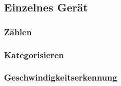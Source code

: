 \subsection{Einzelnes Gerät}
\subsubsection{Zählen}
\subsubsection{Kategorisieren}
\subsubsection{Geschwindigkeitserkennung}